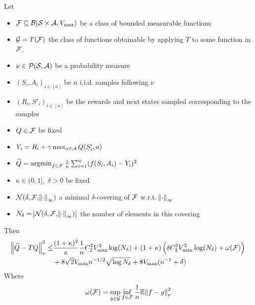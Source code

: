 
\begin{thm}\label{thm:oneStep}
  Let
  \begin{itemize}
    \item $\mathcal{F} \subseteq \mathcal{B}(\mathcal{S}\times\mathcal{A}, V_{\max})$
      be a class of bounded measurable functions
    \item $\mathcal{G} = T(\mathcal{F})$ the class of functions obtainable by
      applying $T$ to some function in $\mathcal{F}$.
    \item $\nu \in \mathcal{P}(\mathcal{S},\mathcal{A})$ be a probability measure
    \item $(S_i, A_i)_{i\in[n]}$ be $n$ i.i.d. samples following $\nu$
    \item $(R_i, S'_i)_{i\in[n]}$ be the rewards and next states sampled
    	corresponding to the samples
    \item $Q \in \mathcal{F}$ be fixed
    \item $Y_i = R_i + \gamma \max_{a \in \mathcal{A}} Q(S'_i, a)$
    \item $\widehat{Q} = \operatorname*{argmin}_{f \in \mathcal{F}} \frac{1}{n}
      \sum_{i=1}^n (f(S_i, A_i) - Y_i)^2$
    \item $\kappa \in (0,1],\; \delta > 0$ be fixed
    \item $\mathcal{N}(\delta, \mathcal{F}, \norm{\cdot}_\infty)$
      a minimal $\delta$-covering of $\mathcal{F}$ w.r.t. $\norm{\cdot}_\infty$
    \item $N_\delta = \abs{\mathcal{N}(\delta, \mathcal{F}, \norm{\cdot}_\infty)}$
      the number of elements in this covering
  \end{itemize}
  Then
  \begin{align*}
    \norm{\widehat{Q} - TQ}_\nu^2
    \leq & \frac{(1+\kappa)^2}{\kappa} \frac{1}{n} C_2^2 V_{\max}^2 \log(N_\delta)
    + (1 + \kappa) \left( \delta C_2^2 V_{\max}^2 \log(N_\delta)
    + \omega(\mathcal{F}) \right) 
    \notag
    \\ & + 8 \sqrt{2} V_{\max} n^{-1/2} \sqrt{\log N_\delta}
    + 8 V_{\max} (n^{-1} + \delta)
  \end{align*}
  Where
  \begin{equation*}
    \omega(\mathcal{F}) = \sup_{g \in \mathcal{G}} \inf_{f \in \mathcal{F}}
    \frac{1}{n} \mathbb{E} \norm{f - g}_\nu^2
    \label{eq:defomega}
  \end{equation*}
\end{thm}
